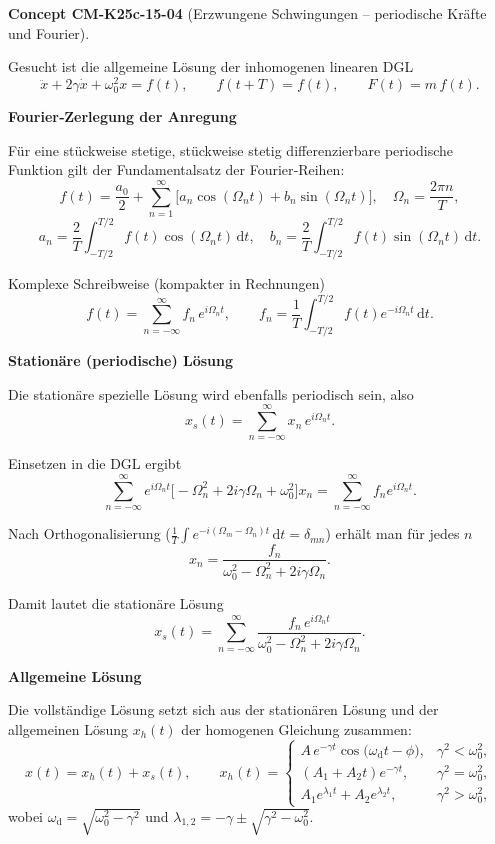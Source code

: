 \documentclass[10pt, letterpaper]{article}
\newcommand{\CustomHeading}[3]{%
  \par\medskip\noindent%
  \textbf{#1 #2} \textnormal{(#3)}.\enskip%
}
\newenvironment{CONC}[2]{\begin{unitbox}\CustomHeading{Concept}{#1}{#2}}{\end{unitbox}}
\begin{document}
\begin{CONC}{CM-K25c-15-04}{Erzwungene Schwingungen – periodische Kräfte und Fourier}
Gesucht ist die allgemeine Lösung der inhomogenen linearen DGL
\[
  \ddot{x}+2\gamma\dot{x}+\omega_{0}^{2}x=f(t),
  \qquad
  f(t+T)=f(t),
  \qquad
  F(t)=m\,f(t).
\]

\textbf{Fourier‐Zerlegung der Anregung}

Für eine stückweise stetige, stückweise stetig differenzierbare
periodische Funktion gilt der Fundamentalsatz der Fourier‐Reihen:
\[
  f(t)=\frac{a_{0}}{2}
       +\sum_{n=1}^{\infty}\!
          \bigl[a_{n}\cos(\Omega_{n}t)+b_{n}\sin(\Omega_{n}t)\bigr],
  \quad
  \Omega_{n}=\frac{2\pi n}{T},
\]
\[
  a_{n}=\frac{2}{T}\!\!\int_{-T/2}^{T/2}\!f(t)\cos(\Omega_{n}t)\,\mathrm dt,
  \quad
  b_{n}=\frac{2}{T}\!\!\int_{-T/2}^{T/2}\!f(t)\sin(\Omega_{n}t)\,\mathrm dt.
\]

Komplexe Schreibweise (kompakter in Rechnungen)
\[
  f(t)=\sum_{n=-\infty}^{\infty}f_{n}\,e^{i\Omega_{n}t},
  \qquad
  f_{n}=\frac{1}{T}\!\!\int_{-T/2}^{T/2}\!f(t)e^{-i\Omega_{n}t}\,\mathrm dt .
\]

\textbf{Stationäre (periodische) Lösung}

Die stationäre spezielle Lösung wird ebenfalls periodisch sein, also
\[
  x_{s}(t)=\sum_{n=-\infty}^{\infty}x_{n}\,e^{i\Omega_{n}t}.
\]

Einsetzen in die DGL ergibt
\[
  \sum_{n=-\infty}^{\infty}
    e^{i\Omega_{n}t}\!
    \bigl[-\Omega_{n}^{2}+2i\gamma\Omega_{n}+\omega_{0}^{2}\bigr]x_{n}
  =\sum_{n=-\infty}^{\infty}f_{n}e^{i\Omega_{n}t}.
\]

Nach Orthogonalisierung (\(\tfrac1T\int e^{-i(\Omega_{m}-\Omega_{n})t}\,\mathrm dt=\delta_{mn}\))
erhält man für jedes $n$
\[
  x_{n}=\frac{f_{n}}
              {\omega_{0}^{2}-\Omega_{n}^{2}+2i\gamma\Omega_{n}} .
\]

Damit lautet die stationäre Lösung
\[
  x_{s}(t)=
    \sum_{n=-\infty}^{\infty}
      \frac{f_{n}\,e^{i\Omega_{n}t}}
           {\omega_{0}^{2}-\Omega_{n}^{2}+2i\gamma\Omega_{n}} .
\]

\textbf{Allgemeine Lösung}

Die vollständige Lösung setzt sich aus der stationären Lösung und der
allgemeinen Lösung \(x_{h}(t)\) der homogenen Gleichung zusammen:
\[
  x(t)=x_{h}(t)+x_{s}(t),
  \qquad
  x_{h}(t)=
  \begin{cases}
    A\,e^{-\gamma t}\cos\bigl(\omega_{\mathrm d}t-\phi\bigr),
    &\gamma^{2}<\omega_{0}^{2},\\[6pt]
    (A_{1}+A_{2}t)e^{-\gamma t},
    &\gamma^{2}=\omega_{0}^{2},\\[6pt]
    A_{1}e^{\lambda_{1}t}+A_{2}e^{\lambda_{2}t},
    &\gamma^{2}>\omega_{0}^{2},
  \end{cases}
\]
wobei
\(\omega_{\mathrm d}=\sqrt{\omega_{0}^{2}-\gamma^{2}}\) und
\(\lambda_{1,2}=-\gamma\pm\sqrt{\gamma^{2}-\omega_{0}^{2}}\).


\end{CONC}
\end{document}
